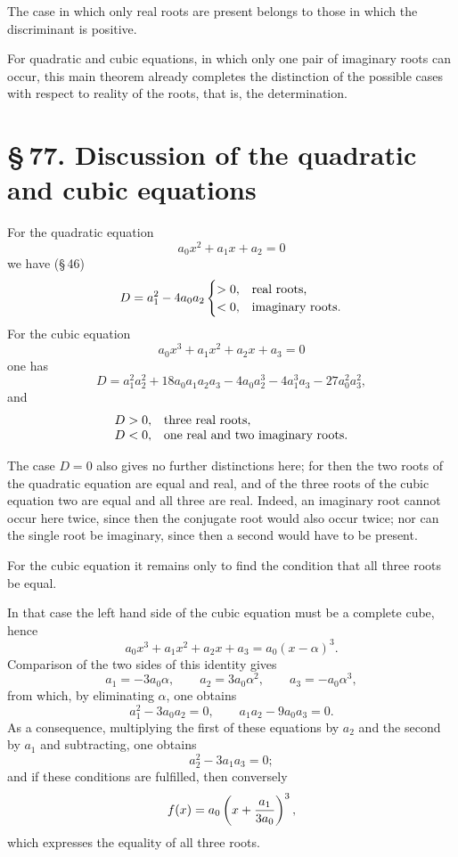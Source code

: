 \documentclass[11pt]{article}
\providecommand{\sect}[2]{\section*{\S\,#1. #2}}
\begin{document}
The case in which only real roots are present belongs to those in which the discriminant is positive.

For quadratic and cubic equations, in which only one pair of imaginary roots can occur, this main theorem already completes the distinction of the possible cases with respect to reality of the roots, that is, the determination.

\sect{77}{Discussion of the quadratic and cubic equations}

For the quadratic equation
\[
        a_0x^2+a_1x+a_2=0
\]
we have (\S\,46)
\[
        D=a_1^2-4a_0a_2
\begin{cases}
>0, & \text{real roots,}\cr
<0, & \text{imaginary roots.}
\end{cases}
\]
For the cubic equation
\[
        a_0x^3+a_1x^2+a_2x+a_3=0
\]
one has
\[
 D=a_1^2a_2^2+18a_0a_1a_2a_3-4a_0a_2^3-4a_1^3a_3-27a_0^2a_3^2,
\]
and
\[
\begin{array}{ll}
D>0, & \text{three real roots,}\cr
D<0, & \text{one real and two imaginary roots.}
\end{array}
\]

The case $D=0$ also gives no further distinctions here; for then the two roots of the quadratic equation are equal and real, and of the three roots of the cubic equation two are equal and all three are real. Indeed, an imaginary root cannot occur here twice, since then the conjugate root would also occur twice; nor can the single root be imaginary, since then a second would have to be present.

For the cubic equation it remains only to find the condition that all three roots be equal.

In that case the left hand side of the cubic equation must be a complete cube, hence
\[
        a_0x^3+a_1x^2+a_2x+a_3=a_0(x-\alpha)^3.
\]
Comparison of the two sides of this identity gives
\[
        a_1=-3a_0\alpha,
        \qquad a_2=3a_0\alpha^2,
        \qquad a_3=-a_0\alpha^3,
\]
from which, by eliminating $\alpha$, one obtains
\begin{equation}
        a_1^2-3a_0a_2=0,
        \qquad a_1a_2-9a_0a_3=0.
\tag{1}
\end{equation}
As a consequence, multiplying the first of these equations by $a_2$ and the second by $a_1$ and subtracting, one obtains
\[
        a_2^2-3a_1a_3=0;
\]
and if these conditions are fulfilled, then conversely
\[
        f(x)=a_0\left(x+{a_1\over 3a_0}\right)^3,
\]
which expresses the equality of all three roots.
\end{document}
